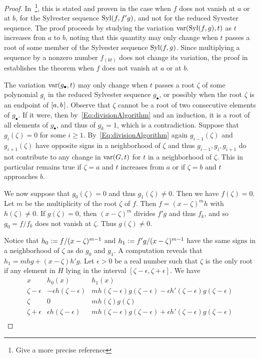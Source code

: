 \begin{proof}
  In~\cite{BCR}\footnote{Give a more precise reference}, this is stated and proven in the case when $f$ does not vanish at $a$ or at $b$,
  for the Sylvester sequence $\operatorname{{\rm Syl}}(f,f'g)$, and not for the reduced Syvester sequence.
  The proof proceeds by studying the variation $\operatorname{{\rm var}}(\operatorname{{\rm Syl}}(f,g), t)$ as $t$ increases fron $a$ to $b$, noting that this quantity may only
  change when $t$ passes a root of some member of the Sylvester sequence $\operatorname{{\rm Syl}}(f,g)$.
  Since multiplying a sequence by a nonzero number $f_(kt)$ does not change its variation, the proof in~\cite{BCR} establishes the theorem
  when $f$ does not vanish at $a$ or at $b$.

  The variation $\operatorname{{\rm var}}(g_\bullet,t)$ may only change when $t$ passes a root $\zeta$ of some polynomial $g_i$ in the reduced Sylvester
  sequence $g_\bullet$, or possibly when the
  root $\zeta$ is an   endpoint of $[a,b\hspace{.05cm}]$.
  Observe that $\zeta$ cannot be a root of two consecutive elements of $g_\bullet$.
  If it were, then by~\eqref{Eq:divisionAlgorithm} and an induction, it is a root of all elements of $g_\bullet$, and thus of $g_k=1$, which is a
  contradiction.
  Suppose that $g_i(\zeta)=0$ for some $i\geq 1$.
  By~\eqref{Eq:divisionAlgorithm} again $g_{i-1}(\zeta)$ and $g_{i+1}(\zeta)$ have opposite signs in a neighborhood of $\zeta$ and thus
  $g_{i-1},g_i,g_{i+1}$ do not contribute to any change in $\operatorname{{\rm var}}(G,t)$ for $t$ in a neighborhood of $\zeta$.
  This in particular remains true if $\zeta=a$ and $t$ increases from $a$ or if $\zeta=b$ and $t$ approaches $b$.

  We now suppose that $g_0(\zeta)=0$ and thus $g_1(\zeta)\neq 0$.
  Then we have $f(\zeta)=0$.
  Let $m$ be the multiplicity of the root $\zeta$ of $f$.
  Then $f=(x-\zeta)^m h$ with $h(\zeta)\neq 0$.
  If $g(\zeta)=0$, then $(x-\zeta)^m$ divides $f'g$ and thus $f_k$, and so $g_0=f/f_k$ does not vanish at $\zeta$.
  Thus $g(\zeta)\neq 0$.

  Notice that $h_0\vcentcolon=f/(x-\zeta)^{m-1}$ and $h_1\vcentcolon=f'g/(x-\zeta)^{m-1}$ have the same signs in a neighborhood of $\zeta$
  as do $g_0$ and $g_1$.
  A computation reveals that $h_1=mhg+(x{-}\zeta)h'g$. 
 Let $\epsilon>0$ be a real number such that $\zeta$ is the only root if any element in $H$ lying in the interval
 $[\zeta-\epsilon,\zeta+\epsilon]$.
 We have
 \[
 \begin{array}{c|c|l}
   x & h_0(x) & h_1(x)\\\hline
   \zeta-\epsilon & -\epsilon h(\zeta-\epsilon)  & mh(\zeta-\epsilon)g(\zeta-\epsilon) - \epsilon h'(\zeta-\epsilon)g(\zeta-\epsilon)\\
   \zeta     &     0    &   mh(\zeta)g(\zeta)\\
   \zeta+\epsilon & \epsilon h(\zeta-\epsilon)  & mh(\zeta-\epsilon)g(\zeta-\epsilon) + \epsilon h'(\zeta-\epsilon)g(\zeta-\epsilon)\\
 \end{array}
 \]
  

\end{proof}
